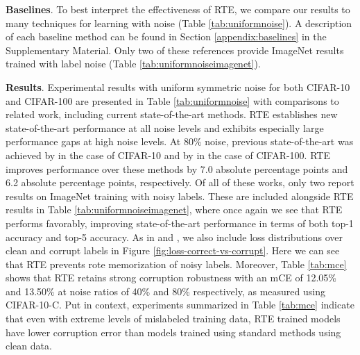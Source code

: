 \documentclass{article}
\begin{document}
\textbf{Baselines}. To best interpret the effectiveness of RTE, we compare our results to many techniques for learning with noise (Table \ref{tab:uniformnoise}). A description of each baseline method can be found in Section \ref{appendix:baselines} in the Supplementary Material.  Only two of these references provide ImageNet results trained with label noise (Table \ref{tab:uniformnoiseimagenet}).

\textbf{Results}. Experimental results with uniform symmetric noise for both CIFAR-10 and CIFAR-100 are presented in Table \ref{tab:uniformnoise} with comparisons to related work, including current state-of-the-art methods. RTE establishes new state-of-the-art performance at all noise levels and exhibits especially large performance gaps at high noise levels. At 80\% noise, previous state-of-the-art was achieved by \cite{arazo2019} in the case of CIFAR-10 and by \cite{li2020} in the case of CIFAR-100. RTE improves performance over these methods by 7.0 absolute percentage points and 6.2 absolute percentage points, respectively. Of all of these works, only two report results on ImageNet training with noisy labels. These are included alongside RTE results in Table \ref{tab:uniformnoiseimagenet}, where once again we see that RTE performs favorably, improving state-of-the-art performance in terms of both top-1 accuracy and top-5 accuracy. As in \cite{arazo2019} and \cite{li2020}, we also include loss distributions over clean and corrupt labels in Figure \ref{fig:loss-correct-vs-corrupt}. Here we can see that RTE prevents rote memorization of noisy labels. Moreover, Table \ref{tab:mce} shows that RTE retains strong corruption robustness with an mCE of 12.05\% and 13.50\% at noise ratios of 40\% and 80\% respectively, as measured using CIFAR-10-C.  Put in context, experiments summarized in Table \ref{tab:mce}  indicate that even with extreme levels of mislabeled training data, RTE trained models have lower corruption error than models trained using standard methods using clean data.
\end{document}
